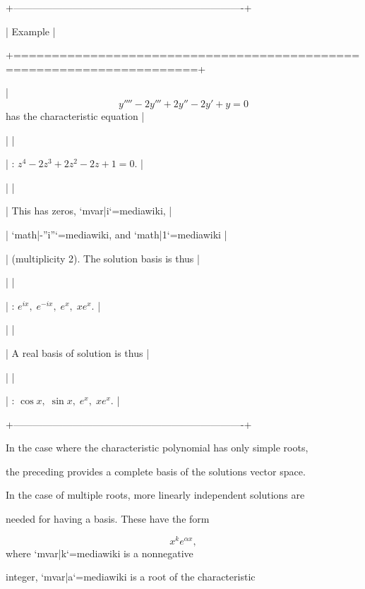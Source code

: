 +----------------------------------------------------------------------+

| Example                                                              |

+======================================================================+

| $$y''''-2y'''+2y''-2y'+y=0$$ has the characteristic equation         |

|                                                                      |

| :   $z^4-2z^3+2z^2-2z+1=0.$                                          |

|                                                                      |

| This has zeros, `{{mvar|i}}`{=mediawiki},                            |

| `{{math|-''i''}}`{=mediawiki}, and `{{math|1}}`{=mediawiki}          |

| (multiplicity 2). The solution basis is thus                         |

|                                                                      |

| :   $e^{ix}, \; e^{-ix}, \; e^x, \; xe^x.$                              |

|                                                                      |

| A real basis of solution is thus                                     |

|                                                                      |

| :   $\cos x, \; \sin x, \; e^x, \; xe^x.$                               |

+----------------------------------------------------------------------+



In the case where the characteristic polynomial has only simple roots,

the preceding provides a complete basis of the solutions vector space.

In the case of multiple roots, more linearly independent solutions are

needed for having a basis. These have the form



$$x^ke^{\alpha x},$$ where `{{mvar|k}}`{=mediawiki} is a nonnegative

integer, `{{mvar|a}}`{=mediawiki} is a root of the characteristic

